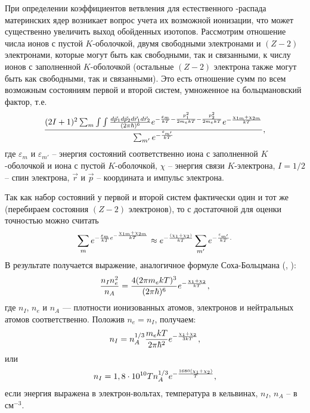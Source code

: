 При определении коэффициентов ветвления для естественного \be-рас\-па\-да
материнских ядер возникает вопрос учета их возможной
ионизации, что может существенно увеличить выход обойденных
изотопов.
Рассмотрим отношение числа ионов с пустой $K$-оболочкой, двумя
свободными электронами и $(Z-2)$ электронами, которые могут быть как свободными,
так и связанными,
к числу ионов с заполненной $K$-оболочкой (остальные $(Z-2)$ электрона также
могут быть как свободными, так и связанными).
Это есть отношение сумм по всем возможным состояниям первой и второй систем,
умноженное на больцмановский фактор, т.е.
\begin{eqnarray}\label{i1}
{{(2I+1)^2 \sum_m \int \int {{d\vec p_1 d\vec p_2 d\vec r_1 d\vec r_2}\over{(2\pi \hbar)^6}} e^{-{\varepsilon_m \over kT}
-{p_1^2 \over 2m_ekT}-{p_2^2 \over 2m_ekT}} e^{-{\chi_{1m} + \chi_{2m} \over kT}} }\over{\sum_{m'} e^{-{\varepsilon_{m'}\over kT}}}},
\end{eqnarray}
где $\varepsilon_{m}$ и $\varepsilon_{m'}$ -- энергия состояний соответственно
иона с заполненной $K$-оболочкой и иона с пустой $K$-оболочкой,  $\chi$ -- энергия связи
$K$-электрона, $I=1/2$ -- спин электрона,
$\vec r$ и  $\vec p$ -- координата и импульс электрона.

Так как набор состояний у первой и второй систем фактически один и тот же
(перебираем состояния $(Z-2)$ электронов), то
с достаточной для оценки точностью
можно считать
\begin{eqnarray}\label{i01}
\sum_m e^{-{\varepsilon_m \over kT} e^{-{\chi_{1m} + \chi_{2m} \over kT}} }
\approx e^{-{(\chi_1 + \chi_2) \over kT}} } \sum_{m'} e^{-{\varepsilon_{m'} \over kT}.
\end{eqnarray}
В результате получается выражение, аналогичное формуле Со\-ха-Боль\-ц\-ма\-на (\cite{aller}, \cite{menzel}):
\begin{eqnarray}\label{i2}
{n_I n_e^2 \over n_A}={{4(2\pi m_e kT )^3}\over{(2\pi \hbar)^6}} e^{-{\chi_1 + \chi_2 \over kT}},
\end{eqnarray}
где $n_I$, $n_e$ и $n_A$ --- плотности ионизованных атомов, электронов и нейтральных атомов
соответственно. Положив $n_e= n_I$, получаем:
\begin{eqnarray}\label{i3}
n_I= n_A^{1/3} {{ m_e kT }\over{2\pi \hbar^2}} e^{-{\chi_1 + \chi_2 \over 3kT}},
\end{eqnarray}
или
\begin{eqnarray}\label{i4}
n_I= 1,8\cdot 10^{10} T n_A^{1/3}  e^{-{1680(\chi_1 + \chi_2) \over T}},
\end{eqnarray}
если энергия выражена в электрон-вольтах,  температура в кельвинах,
$n_I$, $n_A$ -- в $см^{-3}$.


